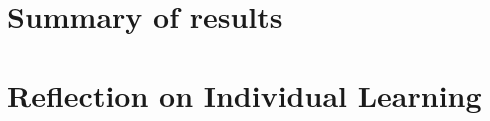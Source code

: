 \documentclass[12pt]{report}
\begin{document}
\section{Summary of results} 

\section{Reflection on Individual Learning}




\printbibliography
\end{document}

